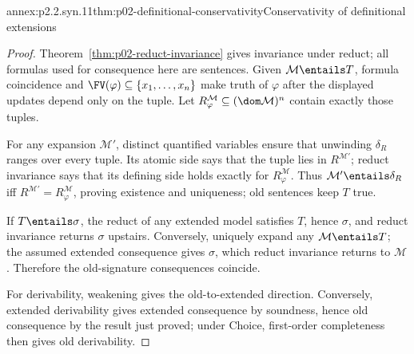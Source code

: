 \begin{annexitem}{annex:p2.2.syn.11}{thm:p02-definitional-conservativity}{Conservativity of definitional extensions}
\begin{proof}
Theorem~\ref{thm:p02-reduct-invariance} gives invariance under reduct; all
formulas used for
consequence here are sentences.  Given \(\mathcal M\entails T\), formula
coincidence and
\(\FV(\varphi)\subseteq\{x_1,\ldots,x_n\}\) make truth of \(\varphi\)
after the displayed updates depend only on the tuple.  Let
\(R^{\mathcal M}_{\varphi}\subseteq(\dom\mathcal M)^n\) contain exactly
those tuples.

For any expansion \(\mathcal M'\), distinct quantified variables ensure that
unwinding \(\delta_R\) ranges over every tuple.  Its atomic side says that the
tuple lies in \(R^{\mathcal M'}\); reduct invariance says that its defining
side holds exactly for \(R^{\mathcal M}_{\varphi}\).  Thus
\(\mathcal M'\entails\delta_R\) iff
\(R^{\mathcal M'}=R^{\mathcal M}_{\varphi}\), proving
existence and uniqueness; old sentences keep \(T\) true.

If \(T\entails\sigma\), the reduct of any extended model satisfies
\(T\), hence \(\sigma\), and reduct invariance returns \(\sigma\) upstairs.
Conversely, uniquely expand any \(\mathcal M\entails T\); the assumed
extended consequence gives \(\sigma\), which reduct invariance returns to
\(\mathcal M\).  Therefore the old-signature consequences coincide.

For derivability, weakening gives the old-to-extended direction.  Conversely,
extended derivability gives extended consequence by soundness, hence old
consequence by the result just proved; under Choice, first-order completeness
then gives old derivability.
\end{proof}
\end{annexitem}

